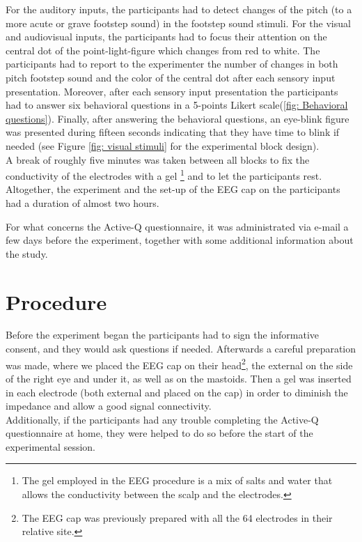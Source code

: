 For the auditory inputs, the participants had to detect changes of the pitch (to a more acute or grave footstep sound) in the footstep sound stimuli. For the visual and audiovisual inputs, the participants had to focus their attention on the central dot of the point-light-figure which changes from red to white. The participants had to report to the experimenter the number of changes in both pitch footstep sound and the color of the central dot after each sensory input presentation.  
Moreover, after each sensory input presentation the participants had to answer six behavioral questions in a 5-points Likert scale(\ref{fig: Behavioral questions}). Finally, after answering the behavioral questions, an eye-blink figure was presented during fifteen seconds indicating that they have time to blink if needed (see Figure \ref{fig: visual stimuli} for the experimental block design).  \\
A break of roughly five minutes was taken between all blocks to fix the conductivity of the electrodes with a gel \footnote{The gel employed in the EEG procedure is a mix of salts and water that allows the conductivity between the scalp and the electrodes.} and to let the participants rest. Altogether, the experiment and the set-up of the EEG cap on the participants had a duration of almost two hours.

For what concerns the Active-Q questionnaire, it was administrated via e-mail a few days before the experiment, together with some additional information about the study.

\section{Procedure}
Before the experiment began the participants had to sign the informative consent, and they would ask questions if needed. Afterwards a careful preparation was made, where we placed the EEG cap on their head\footnote{The EEG cap was previously prepared with all the 64 electrodes in their relative site.}, the external on the side of the right eye and under it, as well as on the mastoids. Then a gel was inserted in each electrode (both external and placed on the cap) in order to diminish the impedance and allow a good signal connectivity. \\
Additionally, if the participants had any trouble completing the Active-Q questionnaire at home, they were helped to do so before the start of the experimental session. 

